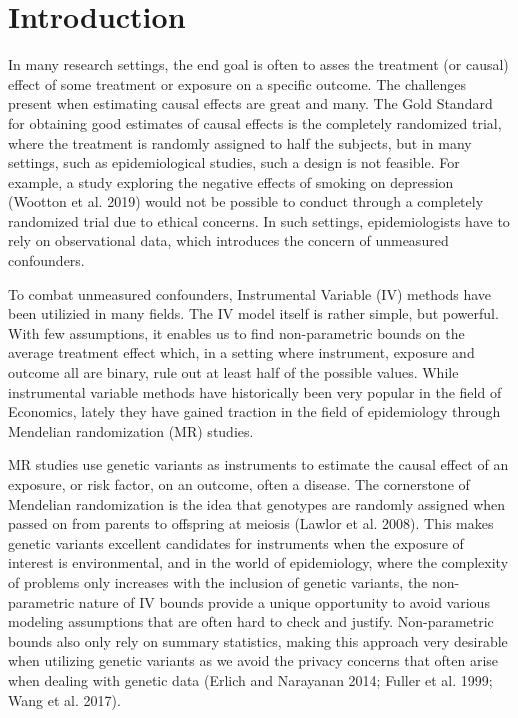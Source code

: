 \documentclass[
]{article}
\author{}
\date{\vspace{-2.5em}}
\theoremstyle{plain}
\begin{document}
{
\setcounter{tocdepth}{2}
\tableofcontents
}
\newpage

\hypertarget{introduction}{%
\section{Introduction}\label{introduction}}

In many research settings, the end goal is often to asses the treatment (or causal) effect of some treatment or exposure on a specific outcome. The challenges present when estimating causal effects are great and many. The Gold Standard for obtaining good estimates of causal effects is the completely randomized trial, where the treatment is randomly assigned to half the subjects, but in many settings, such as epidemiological studies, such a design is not feasible. For example, a study exploring the negative effects of smoking on depression (Wootton et al. 2019) would not be possible to conduct through a completely randomized trial due to ethical concerns. In such settings, epidemiologists have to rely on observational data, which introduces the concern of unmeasured confounders.

To combat unmeasured confounders, Instrumental Variable (IV) methods have been utilizied in many fields. The IV model itself is rather simple, but powerful. With few assumptions, it enables us to find non-parametric bounds on the average treatment effect which, in a setting where instrument, exposure and outcome all are binary, rule out at least half of the possible values. While instrumental variable methods have historically been very popular in the field of Economics, lately they have gained traction in the field of epidemiology through Mendelian randomization (MR) studies.

MR studies use genetic variants as instruments to estimate the causal effect of an exposure, or risk factor, on an outcome, often a disease. The cornerstone of Mendelian randomization is the idea that genotypes are randomly assigned when passed on from parents to offspring at meiosis (Lawlor et al. 2008). This makes genetic variants excellent candidates for instruments when the exposure of interest is environmental, and in the world of epidemiology, where the complexity of problems only increases with the inclusion of genetic variants, the non-parametric nature of IV bounds provide a unique opportunity to avoid various modeling assumptions that are often hard to check and justify. Non-parametric bounds also only rely on summary statistics, making this approach very desirable when utilizing genetic variants as we avoid the privacy concerns that often arise when dealing with genetic data (Erlich and Narayanan 2014; Fuller et al. 1999; Wang et al. 2017).
\end{document}
